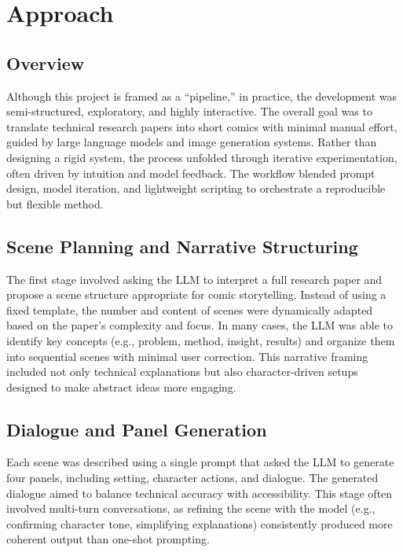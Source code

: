 \section{Approach}\label{sec:approach}

\subsection{Overview}\label{subsec:overview}

Although this project is framed as a ``pipeline,'' in practice, the development was semi-structured,
exploratory, and highly interactive.
The overall goal was to translate technical research papers into short comics with minimal manual effort,
guided by large language models and image generation systems.
Rather than designing a rigid system, the process unfolded through iterative experimentation,
often driven by intuition and model feedback.
The workflow blended prompt design, model iteration, and lightweight scripting to orchestrate a reproducible but flexible method.

\subsection{Scene Planning and Narrative Structuring}\label{subsec:scene-planning-and-narrative-structuring}

The first stage involved asking the LLM to interpret a full research paper and propose
a scene structure appropriate for comic storytelling.
Instead of using a fixed template, the number and content of scenes were dynamically adapted based on the paper's complexity and focus.
In many cases, the LLM was able to identify key concepts (e.g., problem, method, insight, results) and organize them
into sequential scenes with minimal user correction.
This narrative framing included not only technical explanations but also character-driven setups designed to make abstract ideas more engaging.

\subsection{Dialogue and Panel Generation}\label{subsec:dialogue-and-panel-generation}

Each scene was described using a single prompt that asked the LLM to generate four panels, including setting,
character actions, and dialogue.
The generated dialogue aimed to balance technical accuracy with accessibility.
This stage often involved multi-turn conversations, as refining the scene with the model
(e.g., confirming character tone, simplifying explanations) consistently produced more coherent output than one-shot prompting.

